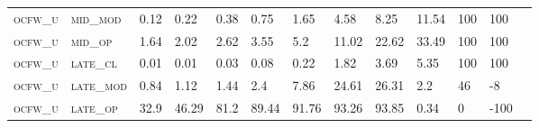 \begin{landscape}
\begin{table}[!htbp]
\begin{tabular}{@{}lllllllllllll@{}}
\footnotesize \textsc{ocfw\_u}     & \footnotesize \textsc{mid\_mod  }                & \footnotesize 0.12            & \footnotesize 0.22            & \footnotesize 0.38             & \footnotesize 0.75             & \footnotesize 1.65             & \footnotesize 4.58             & \footnotesize 8.25       & \footnotesize 11.54    & \footnotesize 100    & \footnotesize 100      \\
\footnotesize \textsc{ocfw\_u}     & \footnotesize \textsc{mid\_op   }                & \footnotesize 1.64            & \footnotesize 2.02            & \footnotesize 2.62             & \footnotesize 3.55             & \footnotesize 5.2              & \footnotesize 11.02            & \footnotesize 22.62      & \footnotesize 33.49    & \footnotesize 100    & \footnotesize 100      \\
\footnotesize \textsc{ocfw\_u}     & \footnotesize \textsc{late\_cl  }                & \footnotesize 0.01            & \footnotesize 0.01            & \footnotesize 0.03             & \footnotesize 0.08             & \footnotesize 0.22             & \footnotesize 1.82             & \footnotesize 3.69       & \footnotesize 5.35     & \footnotesize 100    & \footnotesize 100      \\
\footnotesize \textsc{ocfw\_u}     & \footnotesize \textsc{late\_mod }                & \footnotesize 0.84            & \footnotesize 1.12            & \footnotesize 1.44             & \footnotesize 2.4              & \footnotesize 7.86             & \footnotesize 24.61            & \footnotesize 26.31      & \footnotesize 2.2      & \footnotesize 46     & \footnotesize -8       \\
\footnotesize \textsc{ocfw\_u}     & \footnotesize \textsc{late\_op  }                & \footnotesize 32.9            & \footnotesize 46.29           & \footnotesize 81.2             & \footnotesize 89.44            & \footnotesize 91.76            & \footnotesize 93.26            & \footnotesize 93.85      & \footnotesize 0.34     & \footnotesize 0      & \footnotesize -100     \\
\end{tabular}
\end{table}
\end{landscape}


